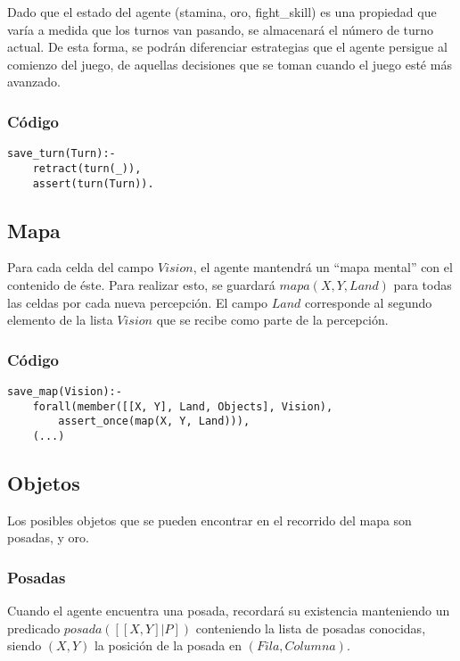 \documentclass[a4paper,10pt,spanish]{article}
\begin{document}
	Dado que el estado del agente (stamina, oro, fight\_skill) es una propiedad que var\'ia a medida que los turnos van pasando, se almacenar\'a el n\'umero de turno actual. De esta forma, se podr\'an diferenciar estrategias que el agente persigue al comienzo del juego, de aquellas decisiones que se toman cuando el juego est\'e m\'as avanzado.
	
		\subsubsection{C\'odigo}
		\begin{lstlisting}
save_turn(Turn):- 
	retract(turn(_)), 
	assert(turn(Turn)).
		\end{lstlisting}

	\subsection{Mapa}
	
	Para cada celda del campo $Vision$, el agente mantendr\'a un ``mapa mental'' con el contenido de \'este. Para realizar esto, se guardar\'a $mapa(X, Y, Land)$ para todas las celdas por cada nueva percepci\'on. El campo $Land$ corresponde al segundo elemento de la lista $Vision$ que se recibe como parte de la percepci\'on.
	
		\subsubsection{C\'odigo}
		\begin{lstlisting}
save_map(Vision):- 
	forall(member([[X, Y], Land, Objects], Vision), 
		assert_once(map(X, Y, Land))), 
	(...)
		\end{lstlisting}
	
	\subsection{Objetos}
	
	Los posibles objetos que se pueden encontrar en el recorrido del mapa son posadas, y oro. 
	
		\subsubsection{Posadas}
		
		Cuando el agente encuentra una posada, recordar\'a su existencia manteniendo un predicado $posada([[X, Y] | P])$ conteniendo la lista de posadas conocidas, siendo $(X, Y)$ la posici\'on de la posada en $(Fila,Columna)$.
		
\end{document}
